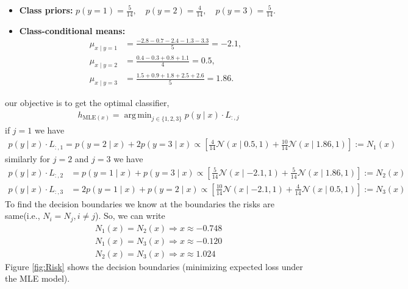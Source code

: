\documentclass[solution,addpoints,12pt]{exam}
\DeclareMathOperator*{\argmin}{arg\,min}
\begin{document}
\begin{questions}
\begin{parts}
\begin{subparts}
\begin{solution}
	\begin{itemize}
		\item \textbf{Class priors:}
		$p(y=1) = \frac{5}{14}, \quad p(y=2) = \frac{4}{14}, \quad p(y=3) = \frac{5}{14}.$
		\item \textbf{Class-conditional means:}
		\begin{align*}
			\mu_{x \mid y=1} &= \frac{-2.8 - 0.7 - 2.4 - 1.3 - 3.3}{5} = -2.1,\\
			\mu_{x \mid y=2} &= \frac{0.4 - 0.3 + 0.8 + 1.1}{4} = 0.5,\\
			\mu_{x \mid y=3} &= \frac{1.5 + 0.9 + 1.8 + 2.5 + 2.6}{5} = 1.86.
		\end{align*}
	\end{itemize}
	our objective is to get the optimal classifier,
	\begin{align*}
		h_{\text{MLE}(x)}=\argmin_{j\in\{1,2,3\}} p(y\mid x)\cdot L_{:,j}
	\end{align*}
	if $j=1$ we have
	\begin{align*}
		p(y\mid x)\cdot L_{:,1} =p(y=2\mid x)+2p(y=3\mid x)\propto\left[\frac{4}{14}\mathcal{N}(x\mid 0.5,1)+\frac{10}{14}\mathcal{N}(x\mid 1.86,1)\right]:=N_1(x)
	\end{align*}
	similarly for $j=2 $ and $j=3$ we have
	\begin{align*}
		p(y\mid x)\cdot L_{:,2}& =p(y=1\mid x)+p(y=3\mid x)\propto\left[\frac{5}{14}\mathcal{N}(x\mid -2.1,1)+\frac{5}{14}\mathcal{N}(x\mid 1.86,1)\right]:=N_2(x)\\
		p(y\mid x)\cdot L_{:,3}& =2p(y=1\mid x)+p(y=2\mid x)\propto\left[\frac{10}{14}\mathcal{N}(x\mid -2.1,1)+\frac{4}{14}\mathcal{N}(x\mid 0.5,1)\right]:=N_3(x)
	\end{align*}
	To find the decision boundaries we know at the boundaries the risks are same(i.e., $N_i=N_j,i\neq j $). So, we can write
	\begin{align*}
		N_1(x)=N_2(x)\Rightarrow x\approx -0.748\\
		N_1(x)=N_3(x)\Rightarrow x\approx -0.120\\
		N_2(x)=N_3(x)\Rightarrow x\approx 1.024
	\end{align*}
	Figure \ref{fig:Risk} shows the decision boundaries (minimizing expected loss under the MLE model).
	\begin{figure}[H]
		\centering
\end{figure}
\end{solution}
\end{subparts}
\end{parts}
\end{questions}
\end{document}
